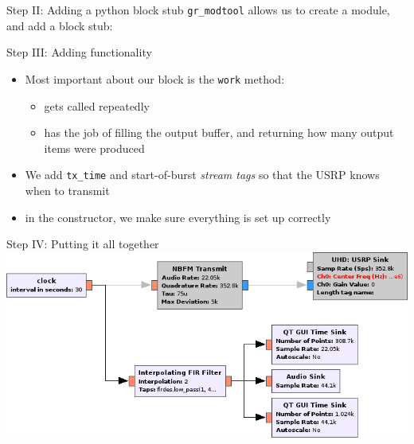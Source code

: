 \documentclass{beamer}
\begin{document}
\begin{frame}{Step II: Adding a python block stub}
  \texttt{gr\_modtool} allows us to create a module, and add a block stub:\bigskip\pause

  \hspace{3em}

\end{frame}
\begin{frame}{Step III: Adding functionality}
  \begin{itemize}
    \item Most important about our block is the \texttt{work} method:
      \begin{itemize}
        \item gets called repeatedly
        \item has the job of filling the output buffer, and returning how many output items were produced
      \end{itemize}
    \item We add \texttt{tx\_time} and start-of-burst \emph{stream tags} so that the USRP knows when to transmit
    \item in the constructor, we make sure everything is set up correctly
  \end{itemize}
\end{frame}
\begin{frame}{Step IV: Putting it all together}
  \includegraphics[width=\textwidth]{clockaudiofg.png}
\end{frame}
\end{document}
